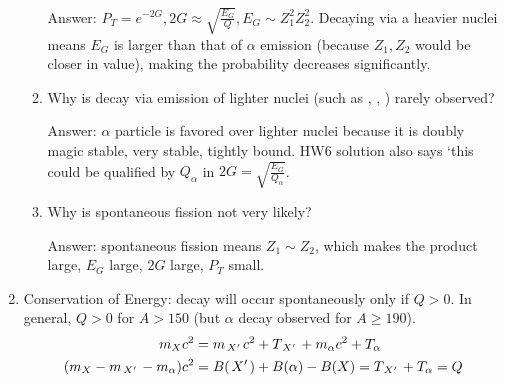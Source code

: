 \documentclass{school-22.101-notes}
\begin{document}
\begin{enumerate}
\begin{enumerate}
Answer: $P_T = e^{-2G}, 2G \approx \sqrt{\frac{E_G}{Q}}, E_G \sim Z_1^2 Z_2^2$. Decaying via a heavier nuclei means $E_G$ is larger than that of $\alpha$ emission (because $Z_1, Z_2$ would be closer in value), making the probability decreases significantly. 
\item Why is decay via emission of lighter nuclei (such as , , ) rarely observed?

Answer: $\alpha$ particle is favored over lighter nuclei because it is doubly magic stable, very stable, tightly bound. HW6 solution also says `this could be qualified by $Q_{\alpha}$ in $2G = \sqrt{\frac{E_G}{Q_{\alpha}}}$. 
\item Why is spontaneous fission not very likely?

Answer: spontaneous fission means $Z_1 \sim Z_2$, which makes the product large, $E_G$ large, $2G$ large, $P_T$ small. 
\end{enumerate}
%

\item Conservation of Energy: decay will occur spontaneously only if $Q >0$. In general, $Q>0$ for $A > 150$ (but $\alpha$ decay observed for $A \ge 190$). 
\begin{align}
m_X c^2 &= m_{\left.X^{\prime}\right.} c^2 + T_{\left.X^{\prime}\right.} + m_{\alpha} c^2 + T_{\alpha} \\
(m_X - m_{\left.X^{\prime}\right.} - m_{\alpha} ) c^2 &= B(\left.X^{\prime}\right.) + B(\alpha) - B(X) =  T_{\left.X^{\prime}\right.} + T_{\alpha} = Q \label{Q-alpha}
\end{align}


\end{enumerate}
\end{document}
